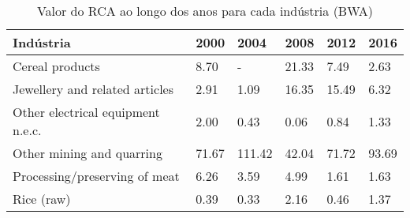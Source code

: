 \begin{table}
\centering
\caption{Valor do RCA ao longo dos anos para cada indústria (BWA)}
\begin{tabular}{p{6cm}p{1.5cm}p{1.5cm}p{1.5cm}p{1.5cm}p{1.5cm}}
\toprule
                        Indústria &  2000 &   2004 &  2008 &  2012 &  2016 \\
\midrule
                  Cereal products &  8.70 &      - & 21.33 &  7.49 &  2.63 \\
   Jewellery and related articles &  2.91 &   1.09 & 16.35 & 15.49 &  6.32 \\
Other electrical equipment n.e.c. &  2.00 &   0.43 &  0.06 &  0.84 &  1.33 \\
        Other mining and quarring & 71.67 & 111.42 & 42.04 & 71.72 & 93.69 \\
    Processing/preserving of meat &  6.26 &   3.59 &  4.99 &  1.61 &  1.63 \\
                       Rice (raw) &  0.39 &   0.33 &  2.16 &  0.46 &  1.37 \\
\bottomrule
\end{tabular}
\end{table}
